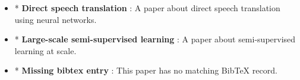 \documentclass{article}
\begin{document}
\begin{itemize}
    \item * \textbf{Direct speech translation} \cite{TexImport2026A}:
    A paper about direct speech translation using neural networks.

    \item * \textbf{Large-scale semi-supervised learning} \cite{TexImport2026B}:
    A paper about semi-supervised learning at scale.

    \item * \textbf{Missing bibtex entry} \cite{MissingKey2026}:
    This paper has no matching BibTeX record.

\end{itemize}
\end{document}
